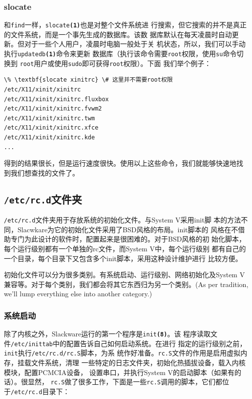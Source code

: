 \subsubsection{slocate}
\label{sec:systemConfig:systemOverview:findingFiles:find}
和\texttt{find}一样，\texttt{slocate\textbf{(1)}}也是对整个文件系统进
行搜索，但它搜索的并不是真正的文件系统，而是一个事先生成的数据库。该数
据库默认在每天凌晨时自动更新。但对于一些个人用户，凌晨时电脑一般处于关
机状态，所以，我们可以手动执行\texttt{updatedb\textbf{(1)}}命令来更新
数据库（执行该命令需要\texttt{root}权限，使用\texttt{su}命令切换到
\texttt{root}用户或使用\texttt{sudo}即可获得\texttt{root}权限）。下面
我们举个例子：
\begin{Verbatim}[frame=single, commandchars=\\\{\}]
\% \textbf{slocate xinitrc} \# 这里并不需要root权限
/etc/X11/xinit/xinitrc
/etc/X11/xinit/xinitrc.fluxbox
/etc/X11/xinit/xinitrc.fvwm2
/etc/X11/xinit/xinitrc.twm
/etc/X11/xinit/xinitrc.xfce
/etc/X11/xinit/xinitrc.kde
...
\end{Verbatim}
得到的结果很长，但是运行速度很快。使用以上这些命令，我们就能够快速地找
到我们想查找的文件了。

\subsection{\texttt{/etc/rc.d}文件夹}
\label{sec:systemConfig:systemOverview:etcRcd}
\texttt{/etc/rc.d}文件夹用于存放系统的初始化文件。与System V采用init脚
本的方法不同，Slacwkare为它的初始化文件采用了BSD风格的布局。init脚本的
风格在不借助专门为此设计的软件时，配置起来是很困难的。对于BSD风格的初
始化脚本，每个运行级别都有一个单独的rc文件，而System V中，每个运行级别
都有自己的一个目录，每个目录下又包含多个init脚本，采用这种设计维护进行
比较方便。

初始化文件可以分为很多类别。有系统启动、运行级别、网络初始化及System V
兼容等。对于每个类别，我们都会将其它东西归为另一个类别。(As per
tradition, we'll lump everything else into another category.)


\subsubsection{系统启动}
\label{sec:systemConfig:systemOverview:etcRcd:systemStartup}

除了内核之外，Slackware运行的第一个程序是\texttt{init\textbf{(8)}}。该
程序读取文件\texttt{/etc/inittab}中的配置告诉自己如何启动系统。在进行
指定的运行级别之前，\texttt{init}执行\texttt{/etc/rc.d/rc.S}脚本，为系
统作好准备。\texttt{rc.S}文件的作用是启用虚拟内存，挂载文件系统，清理
一些特定的日志文件夹，初始化热插拔设备，载入内核模块，配置PCMCIA设备，
设置串口，并执行System V的启动脚本（如果有的话）。很显然，
\texttt{rc.S}做了很多工作，下面是一些\texttt{rc.S}调用的脚本，它们都位
于\texttt{/etc/rc.d}目录下：

